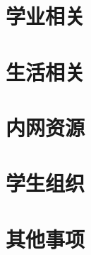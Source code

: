 \documentclass[UTF8]{ctexart}
\begin{document}
\section{学业相关}
\section{生活相关}



\section{内网资源}
\section{学生组织}
\section{其他事项}
\end{document}
